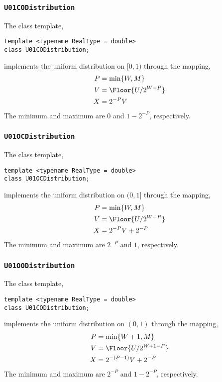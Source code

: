 \subsubsection{\texorpdfstring{\texttt{U01CODistribution}}{U01CODistribution}}

The class template,
\begin{Verbatim}
template <typename RealType = double>
class U01CODistribution;
\end{Verbatim}
implements the uniform distribution on $[0, 1)$ through the mapping,
\begin{align*}
  P &= \min\{W, M\} \\
  V &= \Floor{U / 2^{W - P}} \\
  X &= 2^{-P} V
\end{align*}
The minimum and maximum are $0$ and $1 - 2^{-P}$, respectively.

\subsubsection{\texorpdfstring{\texttt{U01OCDistribution}}{U01OCDistribution}}

The class template,
\begin{Verbatim}
template <typename RealType = double>
class U01OCDistribution;
\end{Verbatim}
implements the uniform distribution on $(0, 1]$ through the mapping,
\begin{align*}
  P &= \min\{W, M\} \\
  V &= \Floor{U / 2^{W - P}} \\
  X &= 2^{-P} V + 2^{-P}
\end{align*}
The minimum and maximum are $2^{-P}$ and $1$, respectively.

\subsubsection{\texorpdfstring{\texttt{U01OODistribution}}{U01OODistribution}}

The class template,
\begin{Verbatim}
template <typename RealType = double>
class U01CODistribution;
\end{Verbatim}
implements the uniform distribution on $(0, 1)$ through the mapping,
\begin{align*}
  P &= \min\{W + 1, M\} \\
  V &= \Floor{U / 2^{W + 1 - P}} \\
  X &= 2^{-(P - 1)} V + 2^{-P}
\end{align*}
The minimum and maximum are $2^{-P}$ and $1 - 2^{-P}$, respectively.


